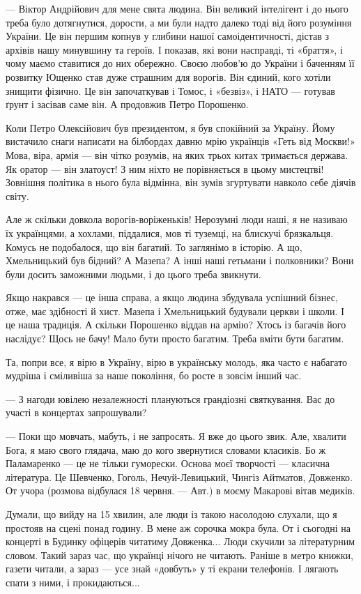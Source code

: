 \begin{longtable}
— Віктор Андрійович для мене свята людина. Він великий інтелігент і до нього
треба було дотягнутися, дорости, а ми були надто далеко тоді від його розуміння
України. Це він першим копнув у глибини нашої самоідентичності, дістав з
архівів нашу минувшину та героїв. І показав, які вони насправді, ті «браття», і
чому маємо ставитися до них обережно. Своєю любов’ю до України і баченням її
розвитку Ющенко став дуже страшним для ворогів. Він єдиний, кого хотіли знищити
фізично. Це він започаткував і Томос, і «безвіз», і НАТО — готував ґрунт і
засівав саме він. А продовжив Петро Порошенко.

Коли Петро Олексійович був президентом, я був спокійний за Україну. Йому
вистачило снаги написати на білбордах давню мрію українців «Геть від Москви!»
Мова, віра, армія — він чітко розумів, на яких трьох китах тримається держава.
Як оратор — він златоуст! З ним ніхто не порівняється в цьому мистецтві!
Зовнішня політика в нього була відмінна, він зумів згуртувати навколо себе
діячів світу.


Але ж скільки довкола ворогів-воріженьків! Нерозумні люди наші, я не називаю їх українцями, а хохлами, піддалися, мов ті туземці, на блискучі брязкальця. Комусь не подобалося, що він багатий. То заглянімо в історію. А що, Хмельницький був бідний? А Мазепа? А інші наші гетьмани і полковники? Вони були досить заможними людьми, і до цього треба звикнути.

Якщо накрався — це інша справа, а якщо людина збудувала успішний бізнес, отже,
має здібності й хист. Мазепа і Хмельницький будували церкви і школи. І це наша
традиція. А скільки Порошенко віддав на армію? Хтось із багачів його наслідує?
Щось не бачу! Мало бути просто багатим. Треба вміти бути багатим.

Та, попри все, я вірю в Україну, вірю в українську молодь, яка часто є набагато
мудріша і сміливіша за наше покоління, бо росте в зовсім інший час.


— З нагоди ювілею незалежності плануються грандіозні святкування. Вас до участі в концертах запрошували?

— Поки що мовчать, мабуть, і не запросять. Я вже до цього звик. Але, хвалити
Бога, я маю свого глядача, маю до кого звернутися словами класиків. Бо ж
Паламаренко — це не тільки гуморески. Основа моєї творчості — класична
література. Це Шевченко, Гоголь, Нечуй-Левицький, Чингіз Айтматов, Довженко. От
учора (розмова відбулася 18 червня. — Авт.) в моєму Макарові вітав медиків.

Думали, що вийду на 15 хвилин, але люди із такою насолодою слухали, що я
простояв на сцені понад годину. В мене аж сорочка мокра була. От і сьогодні на
концерті в Будинку офіцерів читатиму Довженка... Люди скучили за літературним
словом. Такий зараз час, що українці нічого не читають. Раніше в метро книжки,
газети читали, а зараз — усе знай «довбуть» у ті екрани телефонів. І лягають
спати з ними, і прокидаються...



\end{longtable}
